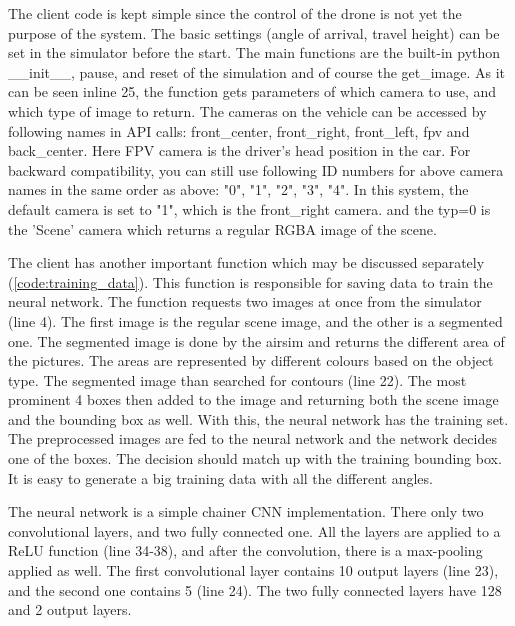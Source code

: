 The client code is kept simple since the control of the drone is not yet the purpose of the system.
The basic settings (angle of arrival, travel height) can be set in the simulator before the start.
The main functions are the built-in python \_\_init\_\_, pause, and reset of the simulation and of course the get\_image.
As it can be seen inline 25, the function gets parameters of which camera to use, and which type of image to return.
The cameras on the vehicle can be accessed by following names in API calls: front\_center, front\_right, front\_left, fpv and back\_center. Here FPV camera is the driver's head position in the car.
For backward compatibility, you can still use following ID numbers for above camera names in the same order as above: "0", "1", "2", "3", "4".
In this system, the default camera is set to "1", which is the front\_right camera.
and the typ=0 is the 'Scene' camera which returns a regular RGBA image of the scene.

The client has another important function which may be discussed separately (\cref{code:training_data}).
This function is responsible for saving data to train the neural network.
The function requests two images at once from the simulator (line 4).
The first image is the regular scene image, and the other is a segmented one.
The segmented image is done by the airsim and returns the different area of the pictures.
The areas are represented by different colours based on the object type.
The segmented image than searched for contours (line 22).
The most prominent 4 boxes then added to the image and returning both the scene image and the bounding box as well.
With this, the neural network has the training set.
The preprocessed images are fed to the neural network and the network decides one of the boxes.
The decision should match up with the training bounding box.
It is easy to generate a big training data with all the different angles.

The neural network is a simple chainer CNN implementation.
There only two convolutional layers, and two fully connected one.
All the layers are applied to a ReLU function (line 34-38), and after the convolution, there is a max-pooling applied as well.
The first convolutional layer contains 10 output layers (line 23), and the second one contains 5 (line 24).
The two fully connected layers have 128 and 2 output layers. 


